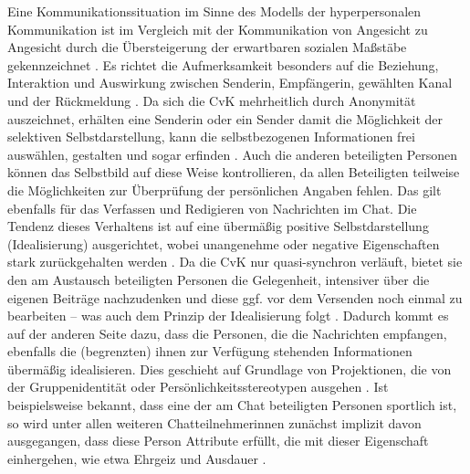 \label{K2:para:hyperpersonale-kommunikation}
Eine Kommunikationssituation im Sinne des Modells der hyperpersonalen Kommunikation ist im Vergleich mit der Kommunikation von Angesicht zu Angesicht durch die Übersteigerung der erwartbaren sozialen Maßstäbe gekennzeichnet \citep[139]{misoch_online-kommunikation_2006}. Es richtet die Aufmerksamkeit besonders auf die Beziehung, Interaktion und Auswirkung zwischen Sender{\textperiodcentered}in, Empfänger{\textperiodcentered}in, gewählten Kanal und der Rückmeldung \citep[164\psq]{trepte_medienpsychologie_2012}. Da sich die CvK mehrheitlich durch Anonymität auszeichnet, erhälten eine Senderin oder ein Sender \glqq damit die Möglichkeit der selektiven Selbstdarstellung, kann die selbstbezogenen Informationen frei auswählen, gestalten und sogar erfinden\grqq{} \citep[165]{trepte_medienpsychologie_2012}. Auch die anderen beteiligten Personen können das Selbstbild auf diese Weise kontrollieren, da allen Beteiligten teilweise die Möglichkeiten zur Überprüfung der persönlichen Angaben fehlen. Das gilt ebenfalls für das Verfassen und Redigieren von Nachrichten im Chat. Die Tendenz dieses Verhaltens ist auf eine übermäßig positive Selbstdarstellung (Idealisierung) ausgerichtet, wobei unangenehme oder negative Eigenschaften stark zurückgehalten werden \citep[139\psq]{misoch_online-kommunikation_2006}. Da die CvK nur quasi-synchron verläuft, bietet sie den am Austausch beteiligten Personen die Gelegenheit, intensiver über die eigenen Beiträge nachzudenken und diese ggf. vor dem Versenden noch einmal zu bearbeiten -- was auch dem Prinzip der Idealisierung folgt \citep[165]{trepte_medienpsychologie_2012}. Dadurch kommt es auf der anderen Seite dazu, dass die Personen, die die Nachrichten empfangen, ebenfalls die (begrenzten) ihnen zur Verfügung stehenden Informationen übermäßig idealisieren. Dies geschieht auf Grundlage von Projektionen, die von der Gruppenidentität oder Persönlichkeitsstereotypen ausgehen \citep[4]{walther_effect_2011}. Ist beispielsweise bekannt, dass eine der am Chat beteiligten Personen sportlich ist, so wird unter allen weiteren Chatteilnehmer{\textperiodcentered}innen zunächst implizit davon ausgegangen, dass diese Person Attribute erfüllt, die mit dieser Eigenschaft einhergehen, wie etwa Ehrgeiz und Ausdauer \citep[167]{trepte_medienpsychologie_2012}.
